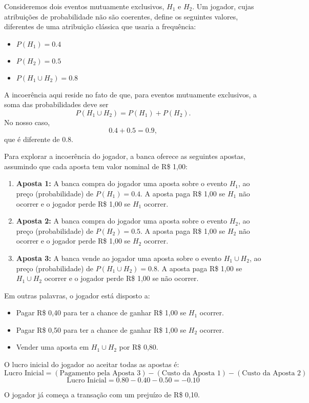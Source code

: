 \documentclass[a4paper]{article}
\begin{document}
    \begin{answer}[Ítem 2.1]
        Consideremos dois eventos mutuamente exclusivos, $H_1$ e $H_2$. 
Um jogador, cujas atribuições de probabilidade não são coerentes, 
define os seguintes valores, diferentes de uma atribuição clássica 
que usaria a frequência:

\begin{itemize}
    \item $P(H_1) = 0.4$
    \item $P(H_2) = 0.5$
    \item $P(H_1 \cup H_2) = 0.8$
\end{itemize}

A incoerência aqui reside no fato de que, para eventos mutuamente exclusivos, 
a soma das probabilidades deve ser
\[
P(H_1 \cup H_2) = P(H_1) + P(H_2).
\]
No nosso caso,
\[
0.4 + 0.5 = 0.9,
\]
que é diferente de $0.8$.
    \end{answer}

    \begin{answer}[Ítem 2.2]
        Para explorar a incoerência do jogador, a banca oferece as seguintes apostas, 
assumindo que cada aposta tem valor nominal de R\$ 1,00:

\begin{enumerate}
    \item \textbf{Aposta 1:} A banca compra do jogador uma aposta sobre o evento $H_1$, 
    ao preço (probabilidade) de $P(H_1) = 0.4$. 
    A aposta paga R\$ 1,00 se $H_1$ não ocorrer e o jogador perde R\$ 1,00 se $H_1$ ocorrer.

    \item \textbf{Aposta 2:} A banca compra do jogador uma aposta sobre o evento $H_2$, 
    ao preço (probabilidade) de $P(H_2) = 0.5$. 
    A aposta paga R\$ 1,00 se $H_2$ não ocorrer e o jogador perde R\$ 1,00 se $H_2$ ocorrer.

    \item \textbf{Aposta 3:} A banca vende ao jogador uma aposta sobre o evento $H_1 \cup H_2$, 
    ao preço (probabilidade) de $P(H_1 \cup H_2) = 0.8$. 
    A aposta paga R\$ 1,00 se $H_1 \cup H_2$ ocorrer e o jogador perde R\$ 1,00 se não ocorrer.
\end{enumerate}

Em outras palavras, o jogador está disposto a:
\begin{itemize}
    \item Pagar R\$ 0,40 para ter a chance de ganhar R\$ 1,00 se $H_1$ ocorrer.
    \item Pagar R\$ 0,50 para ter a chance de ganhar R\$ 1,00 se $H_2$ ocorrer.
    \item Vender uma aposta em $H_1 \cup H_2$ por R\$ 0,80.
\end{itemize}

O lucro inicial do jogador ao aceitar todas as apostas é:
\[
\text{Lucro Inicial} = (\text{Pagamento pela Aposta 3}) 
- (\text{Custo da Aposta 1}) - (\text{Custo da Aposta 2})
\]
\[
\text{Lucro Inicial} = 0.80 - 0.40 - 0.50 = -0.10
\]

\noindent O jogador já começa a transação com um prejuízo de R\$ 0,10.
    \end{answer}
\end{document}
